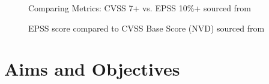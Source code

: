 \documentclass[12pt]{article}
\begin{document}
\begin{figure}
	\centering
	\caption{\label{fig:epss}Comparing Metrics: CVSS 7+ vs. EPSS 10\%+ sourced from \cite{EPSS}}
\end{figure}

\begin{figure}
	\centering
	\caption{\label{fig:epss_and_cvss}EPSS score compared to CVSS Base Score (NVD) sourced from
		\cite{EPSS_USER}}
\end{figure}

\section{Aims and Objectives}
\end{document}
